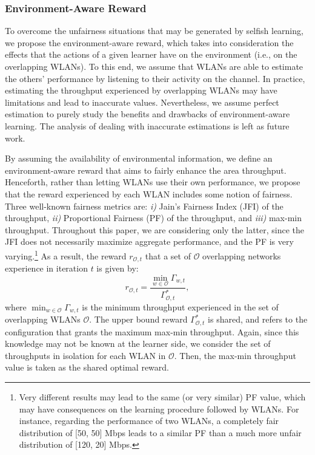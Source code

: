 \documentclass[preprint,12pt]{elsarticle}
\begin{document}
\subsubsection{Environment-Aware Reward}
\label{subsubsection:informed_learning}
To overcome the unfairness situations that may be generated by selfish learning, we propose the environment-aware reward, which takes into consideration the effects that the actions of a given learner have on the environment (i.e., on the overlapping WLANs). To this end, we assume that WLANs are able to estimate the others' performance by listening to their activity on the channel. In practice, estimating the throughput experienced by overlapping WLANs may have limitations and lead to inaccurate values. Nevertheless, we assume perfect estimation to purely study the benefits and drawbacks of environment-aware learning. The analysis of dealing with inaccurate estimations is left as future work.

By assuming the availability of environmental information, we define an environment-aware reward that aims to fairly enhance the area throughput. Henceforth, rather than letting WLANs use their own performance, we propose that the reward experienced by each WLAN includes some notion of fairness. Three well-known fairness metrics are: \emph{i)} Jain's Fairness Index (JFI) of the throughput, \emph{ii)} Proportional Fairness (PF) of the throughput, and \emph{iii)} max-min throughput. Throughout this paper, we are considering only the latter, since the JFI does not necessarily maximize aggregate performance, and the PF is very varying.\footnote{Very different results may lead to the same (or very similar) PF value, which may have consequences on the learning procedure followed by WLANs. For instance, regarding the performance of two WLANs, a completely fair distribution of [50, 50] Mbps leads to a similar PF than a much more unfair distribution of [120, 20] Mbps.} As a result, the reward $r_{\mathcal{O},t}$ that a set of $\mathcal{O}$ overlapping networks experience in iteration $t$ is given by:
\begin{equation}
	r_{\mathcal{O},t} =\frac{\min_{w \in \mathcal{O}} \Gamma_{w,t}}{\Gamma_{\mathcal{O},t}^*}, 
	\nonumber
\end{equation}			
where $\min_{w \in \mathcal{O}} \Gamma_{w,t}$ is the minimum throughput experienced in the set of overlapping WLANs $\mathcal{O}$. The upper bound reward $\Gamma_{\mathcal{O},t}^*$ is shared, and refers to the configuration that grants the maximum max-min throughput. Again, since this knowledge may not be known at the learner side, we consider the set of throughputs in isolation for each WLAN in $\mathcal{O}$. Then, the max-min throughput value is taken as the shared optimal reward.
\end{document}
